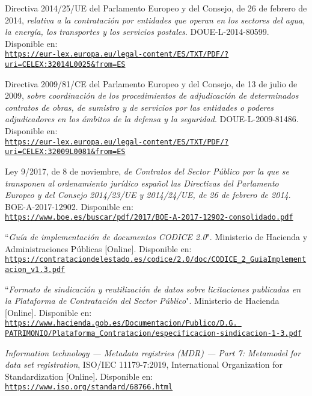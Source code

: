 \begin{thebibliography}{X}
            Directiva 2014/25/UE del Parlamento Europeo y del Consejo, de 26 de febrero de 2014, \textit{relativa a la contratación por entidades que operan en los sectores del agua, la energía, los transportes y los servicios postales}. DOUE-L-2014-80599. Disponible en:
            \\ \texttt{\url{https://eur-lex.europa.eu/legal-content/ES/TXT/PDF/?uri=CELEX:32014L0025&from=ES}}
            
           	Directiva 2009/81/CE del Parlamento Europeo y del Consejo, de 13 de julio de 2009, \textit{sobre coordinación de los procedimientos de adjudicación de determinados contratos de obras, de sumistro y de servicios por las entidades o poderes adjudicadores en los ámbitos de la defensa y la seguridad}. DOUE-L-2009-81486. Disponible en:
            \\ \texttt{\url{https://eur-lex.europa.eu/legal-content/ES/TXT/PDF/?uri=CELEX:32009L0081&from=ES}}
            
           Ley 9/2017, de 8 de noviembre, \textit{de Contratos del Sector Público por la que se transponen al ordenamiento jurídico español las Directivas del Parlamento Europeo y del Consejo 2014/23/UE y 2014/24/UE, de 26 de febrero de 2014}. BOE-A-2017-12902. Disponible en:
            \\ \texttt{\url{https://www.boe.es/buscar/pdf/2017/BOE-A-2017-12902-consolidado.pdf}}
            
        ``\textit{Guía de implementación de documentos CODICE 2.0}". Ministerio de Hacienda y Administraciones Públicas [Online]. Disponible en:
  \\\texttt{\url{https://contrataciondelestado.es/codice/2.0/doc/CODICE_2_GuiaImplementacion_v1.3.pdf}}
            
            ``\textit{Formato de sindicación y reutilización de datos sobre licitaciones publicadas en la Plataforma de Contratación del Sector Público}". Ministerio de Hacienda [Online]. Disponible en:
           \\\texttt{\url{https://www.hacienda.gob.es/Documentacion/Publico/D.G. PATRIMONIO/Plataforma_Contratacion/especificacion-sindicacion-1-3.pdf}}
            
            \textit{Information technology — Metadata registries (MDR) — Part 7: Metamodel for data set registration}, ISO/IEC 11179-7:2019, International Organization for Standardization [Online]. Disponible en:
            \\ \texttt{\url{https://www.iso.org/standard/68766.html}}
            

\end{thebibliography}
